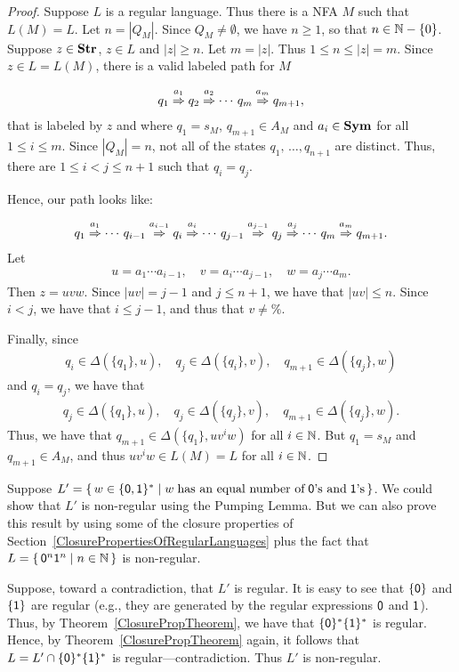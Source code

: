 \begin{proof}
Suppose $L$ is a regular language.  Thus there is a NFA $M$ such that
$L(M)=L$.  Let $n=|Q_M|$.  Since $Q_M\neq\emptyset$, we have
$n\geq 1$, so that $n\in\mathbb{N}-\{0\}$.  Suppose $z\in\mathbf{Str}$, $z\in L$
and $|z|\geq n$.  Let $m=|z|$.  Thus $1\leq n\leq|z|=m$.  Since
$z\in L=L(M)$, there is a valid labeled path for $M$
\begin{gather*}
q_1\stackrel{\strut a_1}{\Rightarrow}q_2\stackrel{\strut a_2}{\Rightarrow}\cdots\,q_m\stackrel{\strut a_m}{\Rightarrow}q_{m+1} ,
\end{gather*}
that is labeled by $z$ and where
$q_1=s_M$, $q_{m+1}\in A_M$ and $a_i\in\mathbf{Sym}$ for all $1\leq
i\leq m$.  Since $|Q_M|=n$,
not all of the states $q_1,\,\ldots,q_{n+1}$ are
distinct.  Thus, there are $1\leq i<j\leq n+1$ such that
$q_i=q_j$.

Hence, our path looks like:
\begin{gather*}
q_1\stackrel{\strut a_1}{\Rightarrow}\cdots\,q_{i-1}\stackrel{\strut a_{i-1}}{\Rightarrow}q_i
\stackrel{\strut a_i}{\Rightarrow}\cdots\,q_{j-1}\stackrel{\strut a_{j-1}}{\Rightarrow}q_j
\stackrel{\strut a_j}{\Rightarrow}\cdots\,q_m\stackrel{\strut a_m}{\Rightarrow}q_{m+1} .
\end{gather*}
Let
\begin{gather*}
u=a_1\cdots a_{i-1},\quad v=a_i\cdots a_{j-1},\quad
w=a_j\cdots a_m .
\end{gather*}
Then $z=uvw$.  Since $|uv|=j-1$ and $j\leq n+1$,
we have that $|uv|\leq n$.  Since $i<j$, we have that $i\leq j-1$,
and thus that $v\neq\%$.

Finally, since
\begin{gather*}
q_i\in\Delta(\{q_1\},u),\quad q_j\in\Delta(\{q_i\},v),\quad
q_{m+1}\in\Delta(\{q_j\},w)
\end{gather*}
and $q_i=q_j$, we have that
\begin{gather*}
q_j\in\Delta(\{q_1\},u),\quad q_j\in\Delta(\{q_j\},v),\quad
q_{m+1}\in\Delta(\{q_j\},w) .
\end{gather*}
Thus, we have that
$q_{m+1}\in\Delta(\{q_1\},uv^iw)$ for all $i\in\mathbb{N}$.  But
$q_1=s_M$ and $q_{m+1}\in A_M$, and thus $uv^iw\in L(M)=L$ for all $i\in\mathbb{N}$.
\end{proof}

Suppose $L'=\{ \, w\in\mathsf{\{0,1\}^*} \mid w\;\allowbreak\mbox{has an equal number of}\allowbreak\;
\mathsf{0}\allowbreak\mbox{'s and}\allowbreak\;\mathsf{1}\allowbreak\mbox{'s}\allowbreak \, \}$.
We could show that $L'$ is non-regular using the Pumping Lemma.
But we can also prove this result by using some of the closure
properties of Section~\ref{ClosurePropertiesOfRegularLanguages}
plus the fact that
$L=\{ \, \mathsf{0}^n\mathsf{1}^n \mid n\in\mathbb{N} \, \}$ is non-regular.

Suppose, toward a contradiction, that $L'$ is regular.  It is easy to
see that $\{\mathsf{0}\}$ and $\{\mathsf{1}\}$ are regular (e.g., they are
generated by the regular expressions $\mathsf{0}$ and $\mathsf{1}$).  Thus,
by Theorem~\ref{ClosurePropTheorem}, we have that
$\{\mathsf{0}\}^*\{\mathsf{1}\}^*$ is regular.  Hence, by
Theorem~\ref{ClosurePropTheorem} again, it follows that
$L=L'\cap\{\mathsf{0}\}^*\{\mathsf{1}\}^*$ is regular---contradiction.  Thus
$L'$ is non-regular.

